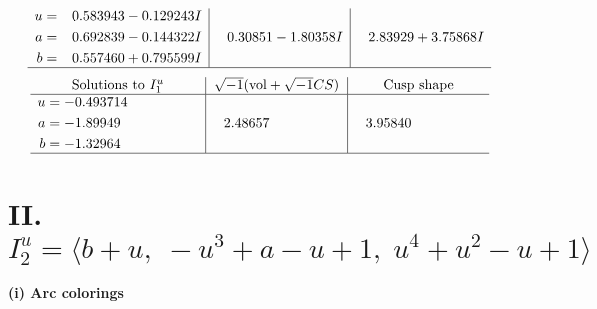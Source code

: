 \documentclass[1p]{elsarticle_modified}
\theoremstyle{definition}
\newcommand{\I}{\sqrt{-1}}
\begin{document}
$$\begin{array}{c|c|c}
\begin{aligned}
u &= \phantom{-}0.583943 - 0.129243 I \\
a &= \phantom{-}0.692839 - 0.144322 I \\
b &= \phantom{-}0.557460 + 0.795599 I\end{aligned}
 & \phantom{-}0.30851 - 1.80358 I & \phantom{-}2.83929 + 3.75868 I\\
 \hline 
 \end{array}$$\newpage$$\begin{array}{c|c|c}  
\text{Solutions to }I^u_{1}& \I (\text{vol} + \sqrt{-1}CS) & \text{Cusp shape}\\
 \hline 
\begin{aligned}
u &= -0.493714\phantom{ +0.000000I} \\
a &= -1.89949\phantom{ +0.000000I} \\
b &= -1.32964\phantom{ +0.000000I}\end{aligned}
 & \phantom{-}2.48657\phantom{ +0.000000I} & \phantom{-}3.95840\phantom{ +0.000000I}\\
 \hline 
 \end{array}$$\newpage\newpage\renewcommand{\arraystretch}{1}
\centering \section*{II. $I^u_{2}= \langle b+u,\;- u^3+a- u+1,\;u^4+u^2- u+1 \rangle$}
\flushleft \textbf{(i) Arc colorings}\\
\end{document}
